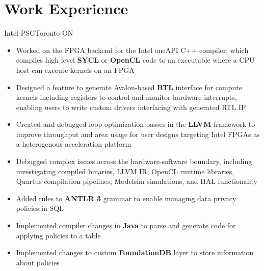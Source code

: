 \documentclass{moderncv}
\begin{document}
\makecvtitle
\section{Work Experience}

{Intel PSG}{Toronto ON}{}
{\begin{itemize}
    \item Worked on the FPGA backend for the Intel oneAPI C++ compiler, which compiles high level \textbf{SYCL} or \textbf{OpenCL} code to an executable where a CPU host can execute kernels on an FPGA
    \item Designed a feature to generate Avalon-based \textbf{RTL} interface for compute kernels including registers to control and monitor hardware interrupts, enabling users to write custom drivers interfacing with generated RTL IP
    \item Created and debugged loop optimization passes in the \textbf{LLVM} framework to improve throughput and area usage for user designs targeting Intel FPGAs as a heterogenous acceleration platform
    \item Debugged complex issues across the hardware-software boundary, including investigating compiled binaries, LLVM IR, OpenCL runtime libraries, Quartus compilation pipelines, Modelsim simulations, and HAL functionality
\end{itemize}}

{\begin{itemize}
    \item Added rules to \textbf{ANTLR 3} grammar to enable managing data privacy policies in SQL
    \item Implemented compiler changes in \textbf{Java} to parse and generate code for applying policies to a table
    \item Implemented changes to custom \textbf{FoundationDB} layer to store information about policies
\end{itemize}}

\begin{comment}
Snowflake1: Aggregation Policy Parser Stuff
basically, added a new type of policy which is an SQL object
it had to be added to the parser through an ANTLR grammar
but there was an issue with the way the grammar was factored into sub-grammars
so I had to inspect generated code and eventually refactor the root rules
into subrules in separate files
    rootparser.g:
        rule -> rule1 | rule2 | rule3;
    rules1.g:
        rule1 -> [...]
        rule2 -> [...]
    rules2.g:
        rule3 -> [...]
became
    rootparser.g:
        rule -> rules1 | rules2
    rules1.g:
        rules1 -> rule1 | rule2
        rule1 -> [...]
        rule2 -> [...]
    rules2.g:
        rule3 -> [...]
and then i was able to implement the rules for that type of policy
\end{comment}
\end{document}
